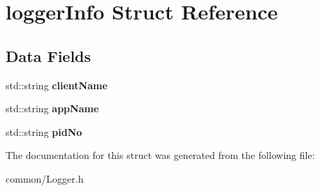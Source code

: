 \hypertarget{structloggerInfo}{\section{logger\-Info Struct Reference}
\label{structloggerInfo}
}
\subsection*{Data Fields}
\begin{DoxyCompactItemize}
\item 
\hypertarget{structloggerInfo_addba2d28a1df00c5e04dcee47434cf09}{std\-::string {\bfseries client\-Name}}\label{structloggerInfo_addba2d28a1df00c5e04dcee47434cf09}

\item 
\hypertarget{structloggerInfo_afa1407f38913794ea9933c15e8684e60}{std\-::string {\bfseries app\-Name}}\label{structloggerInfo_afa1407f38913794ea9933c15e8684e60}

\item 
\hypertarget{structloggerInfo_a383138c846b52e02bce1767698e22fc8}{std\-::string {\bfseries pid\-No}}\label{structloggerInfo_a383138c846b52e02bce1767698e22fc8}

\end{DoxyCompactItemize}


The documentation for this struct was generated from the following file\-:\begin{DoxyCompactItemize}
\item 
common/Logger.\-h\end{DoxyCompactItemize}
